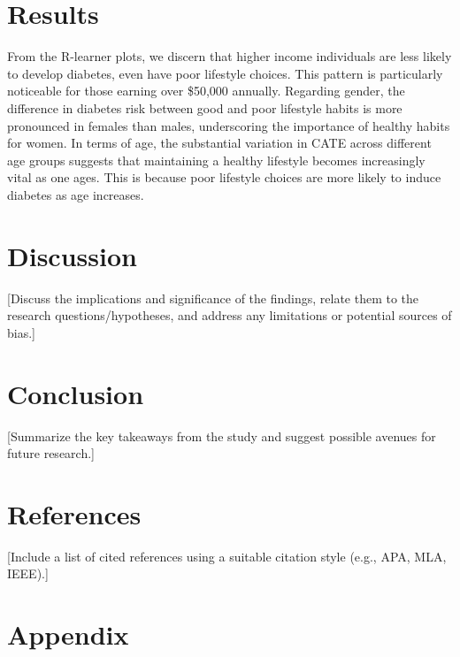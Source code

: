 \documentclass[
  12pt,
]{article}
\begin{document}
\hypertarget{results}{%
\section{Results}\label{results}}

From the R-learner plots, we discern that higher income individuals are
less likely to develop diabetes, even have poor lifestyle choices. This
pattern is particularly noticeable for those earning over \$50,000
annually. Regarding gender, the difference in diabetes risk between good
and poor lifestyle habits is more pronounced in females than males,
underscoring the importance of healthy habits for women. In terms of
age, the substantial variation in CATE across different age groups
suggests that maintaining a healthy lifestyle becomes increasingly vital
as one ages. This is because poor lifestyle choices are more likely to
induce diabetes as age increases.

\hypertarget{discussion}{%
\section{Discussion}\label{discussion}}

{[}Discuss the implications and significance of the findings, relate
them to the research questions/hypotheses, and address any limitations
or potential sources of bias.{]}

\hypertarget{conclusion}{%
\section{Conclusion}\label{conclusion}}

{[}Summarize the key takeaways from the study and suggest possible
avenues for future research.{]}

\hypertarget{references}{%
\section{References}\label{references}}

{[}Include a list of cited references using a suitable citation style
(e.g., APA, MLA, IEEE).{]}

\newpage

\hypertarget{appendix}{%
\section{Appendix}\label{appendix}}
\end{document}
